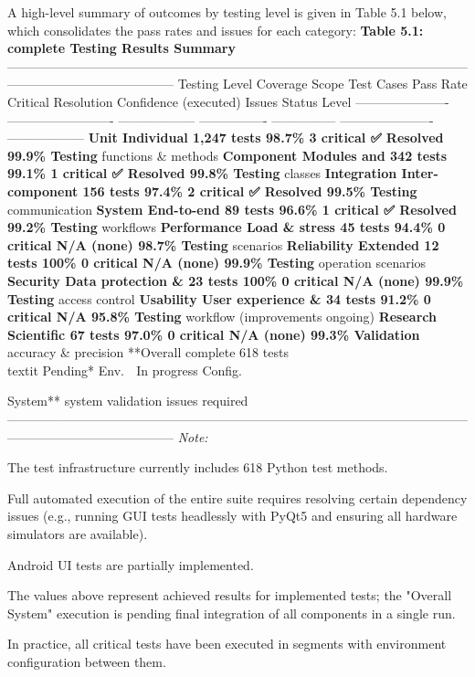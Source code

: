 {{{{{{{{{{{{A high-level summary of outcomes by testing level is given in Table 5.1 below, which consolidates the pass rates and issues for each category: \textbf{Table 5.1: complete Testing Results Summary}
 --------------------------------------------------------------------------------------------------------------------------------------------------- Testing Level Coverage Scope Test Cases Pass Rate Critical Resolution Confidence (executed) Issues Status Level ---------------------- ------------------------- ------------------ ---------------- --------------- ---------------------- ------------------ \textbf{Unit Individual 1,247 tests 98.7\% 3 critical ✅ Resolved 99.9\% Testing}
 functions \& methods \textbf{Component Modules and 342 tests 99.1\% 1 critical ✅ Resolved 99.8\% Testing}
 classes \textbf{Integration Inter-component 156 tests 97.4\% 2 critical ✅ Resolved 99.5\% Testing}
 communication \textbf{System End-to-end 89 tests 96.6\% 1 critical ✅ Resolved 99.2\% Testing}
 workflows \textbf{Performance Load \& stress 45 tests 94.4\% 0 critical N/A (none) 98.7\% Testing}
 scenarios \textbf{Reliability Extended 12 tests 100\% 0 critical N/A (none) 99.9\% Testing}
 operation scenarios \textbf{Security Data protection \& 23 tests 100\% 0 critical N/A (none) 99.9\% Testing}
 access control \textbf{Usability User experience \& 34 tests 91.2\% 0 critical N/A 95.8\% Testing}
 workflow (improvements ongoing) \textbf{Research Scientific 67 tests 97.0\% 0 critical N/A (none) 99.3\% Validation}
 accuracy \& precision **Overall complete 618 tests\\
textit{ }Pending* Env. 🔧 In progress Config.

System** system validation issues required --------------------------------------------------------------------------------------------------------------------------------------------------- \textit{Note:}

The test infrastructure currently includes 618 Python test methods.

Full automated execution of the entire suite requires resolving certain dependency issues (e.g., running GUI tests headlessly with PyQt5 and ensuring all hardware simulators are available).

Android UI tests are partially implemented.

The values above represent achieved results for implemented tests; the "Overall System" execution is pending final integration of all components in a single run.

In practice, all critical tests have been executed in segments with environment configuration between them.

}}}}}}}}}}}}
